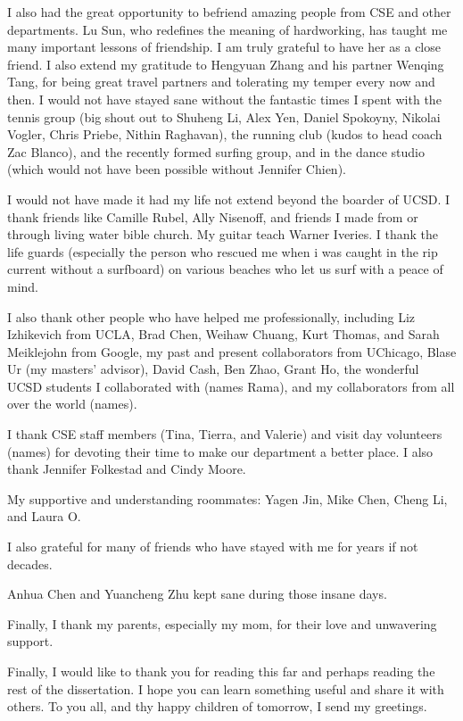 \documentclass[12pt]{ucsddissertation}
\begin{document}
\begin{acknowledgements}
I also had the great opportunity to befriend amazing people from CSE and other departments. Lu Sun, who redefines the meaning of hardworking, has taught me many important lessons of friendship. I am truly grateful to have her as a close friend. I also extend my gratitude to Hengyuan Zhang and his partner Wenqing Tang, for being great travel partners and tolerating my temper every now and then. I would not have stayed sane without the fantastic times I spent with the tennis group (big shout out to Shuheng Li, Alex Yen, Daniel Spokoyny, Nikolai Vogler, Chris Priebe, Nithin Raghavan), the running club (kudos to head coach Zac Blanco), and the recently formed surfing group, and in the dance studio (which would not have been possible without Jennifer Chien).

I would not have made it had my life not extend beyond the boarder of UCSD. I thank friends like Camille Rubel, Ally Nisenoff, and friends I made from or through living water bible church. My guitar teach Warner Iveries. I thank the life guards (especially the person who rescued me when i was caught in the rip current without a surfboard) on various beaches who let us surf with a peace of mind.

I also thank other people who have helped me professionally, including Liz Izhikevich from UCLA, Brad Chen, Weihaw Chuang, Kurt Thomas, and Sarah Meiklejohn from Google, my past and present collaborators from UChicago, Blase Ur (my masters' advisor), David Cash, Ben Zhao, Grant Ho, the wonderful UCSD students I collaborated with (names Rama), and my collaborators from all over the world (names).

I thank CSE staff members (Tina, Tierra, and Valerie) and visit day volunteers (names) for devoting their time to make our department a better place. I also thank Jennifer Folkestad and Cindy Moore.

My supportive and understanding roommates: Yagen Jin, Mike Chen, Cheng Li, and Laura O. 

I also grateful for many of friends who have stayed with me for years if not decades.

Anhua Chen and Yuancheng Zhu kept sane during those insane days.

Finally, I thank my parents, especially my mom, for their love and unwavering support.

Finally, I would like to thank you for reading this far and perhaps reading the rest of the dissertation. I hope you can learn something useful and share it with others. To you all, and thy happy children of tomorrow, I send my greetings.


\end{acknowledgements}
\end{document}
